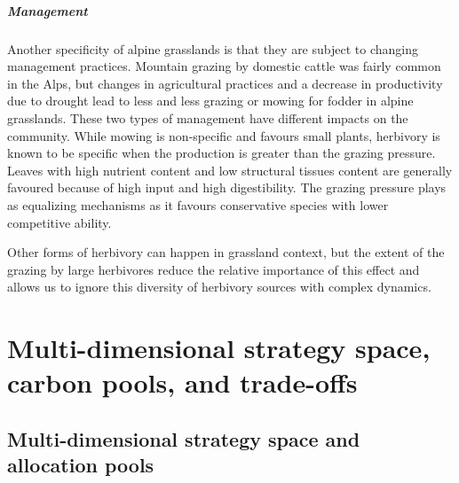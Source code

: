 \paragraph{Management}
Another specificity of alpine grasslands is that they are subject to changing management practices. Mountain grazing by domestic cattle was fairly common in the Alps, but changes in agricultural practices and a decrease in productivity due to drought lead to less and less grazing or mowing for fodder in alpine grasslands. These two types of management have different impacts on the community. While mowing is non-specific and favours small plants, herbivory is known to be specific when the production is greater than the grazing pressure. Leaves with high nutrient content and low structural tissues content are generally favoured because of high input and high digestibility. The grazing pressure plays as equalizing mechanisms as it favours conservative species with lower competitive ability.

Other forms of herbivory can happen in grassland context, but the extent of the grazing by large herbivores reduce the relative importance of this effect and allows us to ignore this diversity of herbivory sources with complex dynamics.


\chapter{Multi-dimensional strategy space, carbon pools, and trade-offs} \label{chapter:strategy-space}
\section{Multi-dimensional strategy space and allocation pools}
%

